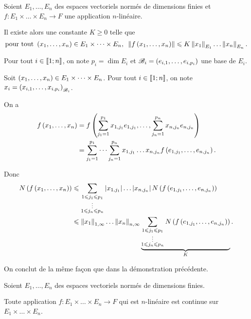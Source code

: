 \begin{theo}
Soient \(E_1,\dots,E_n\) des espaces vectoriels normés de dimensions finies et \(f:E_1\times\dots\times E_n\to F\) une application \(n\)-linéaire.

Il existe alors une constante \(K\geq0\) telle que \[\quantifs{\tpt\paren{x_1,\dots,x_n}\in E_1\times\dots\times E_n}\norme{f\paren{x_1,\dots,x_n}}\leq K\norme{x_1}_{E_1}\dots\norme{x_n}_{E_n}.\]
\end{theo}

\begin{dem}
Pour tout \(i\in\left\llbracket1;n\right\rrbracket\), on note \(p_i=\dim E_i\) et \(\mathscr{B}_i=\left(e_{i,1},\dots,e_{i,p_i}\right)\) une base de \(E_i\).

Soit \(\left(x_1,\dots,x_n\right)\in E_1\times\dots\times E_n\). Pour tout \(i\in\left\llbracket1;n\right\rrbracket\), on note \(x_i=\left(x_{i,1},\dots,x_{i,p_i}\right)_{\mathscr{B}_i}\).

On a \[\begin{aligned}
f\left(x_1,\dots,x_n\right)&=f\left(\sum_{j_1=1}^{p_1}x_{1,j_1}e_{1,j_1},\dots,\sum_{j_n=1}^{p_n}x_{n,j_n}e_{n,j_n}\right) \\
&=\sum_{j_1=1}^{p_1}\dots\sum_{j_n=1}^{p_n}x_{1,j_1}\dots x_{n,j_n}f\left(e_{1,j_1},\dots,e_{n,j_n}\right).
\end{aligned}\]

Donc \[\begin{aligned}
N\paren{f\paren{x_1,\dots,x_n}}&\leq\sum_{\substack{1\leq j_1\leq p_1 \\ \vdots \\ 1\leq j_n\leq p_n}}\abs{x_{1,j_1}}\dots\abs{x_{n,j_n}}N\paren{f\paren{e_{1,j_1},\dots,e_{n,j_n}}} \\
&\leq\norme{x_1}_{1,\infty}\dots\norme{x_n}_{n,\infty}\underbrace{\sum_{\substack{1\leq j_1\leq p_1 \\ \vdots \\ 1\leq j_n\leq p_n}}N\paren{f\paren{e_{1,j_1},\dots,e_{n,j_n}}}}_{K}.
\end{aligned}\]

On conclut de la même façon que dans la démonstration précédente.
\end{dem}

\begin{cor}
Soient \(E_1,\dots,E_n\) des espaces vectoriels normés de dimensions finies.

Toute application \(f:E_1\times\dots\times E_n\to F\) qui est \(n\)-linéaire est continue sur \(E_1\times\dots\times E_n\).
\end{cor}

